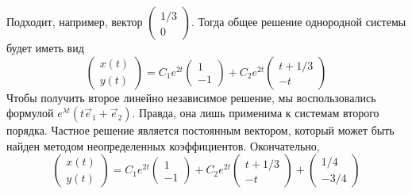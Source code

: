 \begin{problem}
\begin{sol}
Подходит, например, вектор $\begin{pmatrix}
1/3 \\
0
\end{pmatrix}$.
Тогда общее решение однородной системы будет иметь вид
\[
\begin{pmatrix}
x(t) \\
y(t)
\end{pmatrix} =
C_1 e^{2t}
\begin{pmatrix}
1 \\
-1
\end{pmatrix}
+ C_2 e^{2t}
\begin{pmatrix}
t+1/3 \\
-t
\end{pmatrix}
\]
Чтобы получить второе линейно независимое решение, мы воспользовались формулой $e^{\lambda t }(t\vec{e}_1+\vec{e}_2)$. Правда, она лишь применима к системам второго порядка. Частное решение является постоянным вектором, который может быть найден методом неопределенных коэффициентов. Окончательно,
\[
\begin{pmatrix}
x(t) \\
y(t)
\end{pmatrix} =
C_1 e^{2t}
\begin{pmatrix}
1 \\
-1
\end{pmatrix}
+ C_2 e^{2t}
\begin{pmatrix}
t+1/3 \\
-t
\end{pmatrix}+
\begin{pmatrix}
1/4 \\
-3/4
\end{pmatrix}
\]
\end{sol}
\end{problem}

